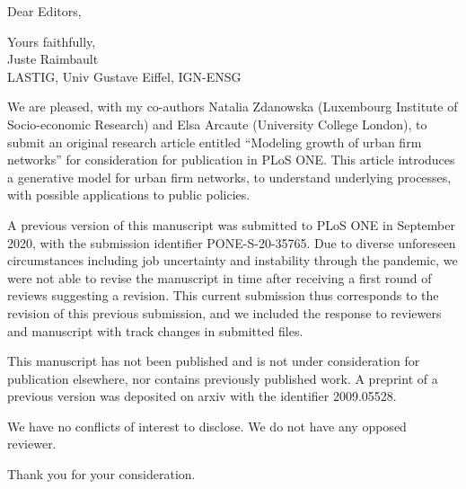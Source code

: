 \documentclass[11pt,a4paper,sans]{moderncv}        %
\begin{document}

\date{May 12th 2022}
\opening{Dear Editors,}
\closing{Yours faithfully,\\
Juste Raimbault\\
LASTIG, Univ Gustave Eiffel, IGN-ENSG
}
\makelettertitle

\justify
We are pleased, with my co-authors Natalia Zdanowska (Luxembourg Institute of Socio-economic Research) and Elsa Arcaute (University College London), to submit an original research article entitled ``Modeling growth of urban firm networks'' for consideration for publication in PLoS ONE. This article introduces a generative model for urban firm networks, to understand underlying processes, with possible applications to public policies. %

A previous version of this manuscript was submitted to PLoS ONE in September 2020, with the submission identifier PONE-S-20-35765. Due to diverse unforeseen circumstances including job uncertainty and instability through the pandemic, we were not able to revise the manuscript in time after receiving a first round of reviews suggesting a revision. This current submission thus corresponds to the revision of this previous submission, and we included the response to reviewers and manuscript with track changes in submitted files.

This manuscript has not been published and is not under consideration for publication elsewhere, nor contains previously published work. A preprint of a previous version was deposited on arxiv with the identifier 2009.05528.

We have no conflicts of interest to disclose. We do not have any opposed reviewer.



Thank you for your consideration.
\justify




\makeletterclosing
\end{document}
